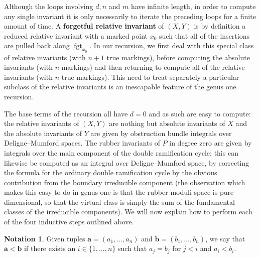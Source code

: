 \documentclass[11pt]{amsart}
\newcommand{\fgt}{\operatorname{fgt}}
\theoremstyle{definition}
\newtheorem{notation}[thm]{Notation}
\theoremstyle{definition}
\begin{document}
\begin{algorithm}
\DontPrintSemicolon
{}
\end{algorithm}
\noindent Although the loops involving $d, n$ and $m$ have infinite length, in order to compute any single invariant it is only necessarily to iterate the preceding loops for a finite amount of time. A \textbf{forgetful relative invariant} of $(X,Y)$ is by definition a reduced relative invariant with a marked point $x_0$ such that all of the insertions are pulled back along $\fgt_{x_0}$. In our recursion, we first deal with this special class of relative invariants (with $n+1$ true markings), before computing the absolute invariants (with $n$ markings) and then returning to compute all of the relative invariants (with $n$ true markings). This need to treat separately a particular subclass of the relative invariants is an inescapable feature of the genus one recursion.

The base terms of the recursion all have $d=0$ and as such are easy to compute: the relative invariants of $(X,Y)$ are nothing but absolute invariants of $X$ and the absolute invariants of $Y$ are given by obstruction bundle integrals over Deligne--Mumford spaces. The rubber invariants of $P$ in degree zero are given by integrals over the main component of the double ramification cycle; this can likewise be computed as an integral over Deligne--Mumford space, by correcting the formula for the ordinary double ramification cycle \cite{Hain,JPPZ} by the obvious contribution from the boundary irreducible component (the observation which makes this easy to do in genus one is that the rubber moduli space is pure-dimensional, so that the virtual class is simply the sum of the fundamental classes of the irreducible components). We will now explain how to perform each of the four inductive steps outlined above.

\begin{notation}Given tuples $\mathbf{a}=(a_1,\ldots,a_n)$ and $\mathbf{b}=(b_1,\ldots,b_n)$, we say that $\mathbf{a}<\mathbf{b}$ if there exists an $i \in \{1,\ldots,n\}$ such that $a_j = b_j$ for $j < i$ and $a_i < b_i$.\end{notation}
\end{document}
